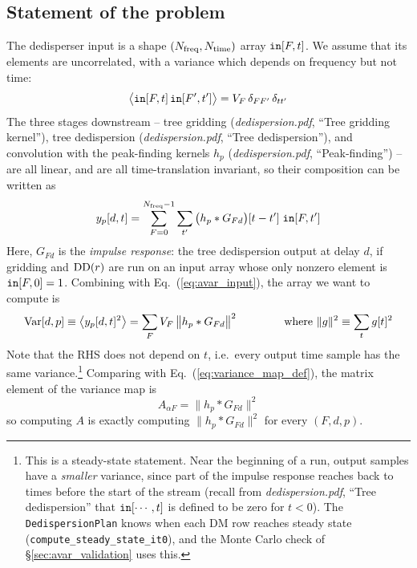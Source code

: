 \documentclass{article}
\numberwithin{equation}{section}   %
\def\DD{{\rm DD}}
\newcommand{\ddnotes}[1]{{\em dedispersion.pdf}, ``#1''}
\begin{document}
\subsection{Statement of the problem}
\label{sec:avar_statement}

The dedisperser input is a shape $(N_{\rm freq}, N_{\rm time})$ array ${\tt in}[F,t]$.
We assume that its elements are uncorrelated, with a variance which depends on frequency but not
time:
\begin{equation}
\big\langle {\tt in}[F,t] \, {\tt in}[F',t'] \big\rangle = V_F \, \delta_{FF'} \, \delta_{tt'}
  \label{eq:avar_input}
\end{equation}
The three stages downstream -- tree gridding (\ddnotes{Tree gridding kernel}), tree dedispersion
(\ddnotes{Tree dedispersion}), and convolution with the peak-finding kernels $h_p$
(\ddnotes{Peak-finding}) -- are all linear, and are all time-translation invariant, so their
composition can be written as
\begin{equation}
y_p[d,t] = \sum_{F=0}^{N_{\rm freq}-1} \sum_{t'} \big( h_p * G_{Fd} \big)[t-t'] \; {\tt in}[F,t']
\end{equation}
Here, $G_{Fd}$ is the {\em impulse response}: the tree dedispersion output at delay $d$, if
gridding and $\DD(r)$ are run on an input array whose only nonzero element is ${\tt in}[F,0]=1$.
Combining with Eq.\ (\ref{eq:avar_input}), the array we want to compute is
\begin{equation}
{\rm Var}[d,p] \equiv \big\langle y_p[d,t]^2 \big\rangle
  = \sum_F V_F \, \big\| h_p * G_{Fd} \big\|^2
  \hspace{1.5cm} \mbox{where } \|g\|^2 \equiv \sum_t g[t]^2
  \label{eq:avar_master}
\end{equation}
Note that the RHS does not depend on $t$, i.e.\ every output time sample has the same
variance.\footnote{This is a steady-state statement. Near the beginning of a run, output samples
have a {\em smaller} variance, since part of the impulse response reaches back to times before the
start of the stream (recall from \ddnotes{Tree dedispersion} that ${\tt in}[\cdots,t]$ is
defined to be zero for $t<0$). The {\tt DedispersionPlan} knows when each DM row reaches steady
state ({\tt compute\_steady\_state\_it0}), and the Monte Carlo check of
\S\ref{sec:avar_validation} uses this.}
Comparing with Eq.\ (\ref{eq:variance_map_def}), the matrix element of the variance map is
\begin{equation}
A_{\alpha F} = \big\| h_p * G_{Fd} \big\|^2
\end{equation}
so computing $A$ is exactly computing $\|h_p * G_{Fd}\|^2$ for every $(F, d, p)$.
\end{document}
